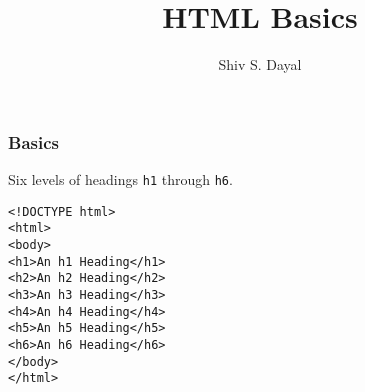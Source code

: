 \documentclass[aspectratio=1610]{beamer}
\begin{document}
\begin{frame}
\title{HTML Basics}
\author{Shiv S. Dayal}
\titlepage
\end{frame}

\begin{frame}[fragile]
\frametitle{Basics}
Six levels of headings \texttt{h1} through \texttt{h6}.
\begin{verbatim}
<!DOCTYPE html>
<html>
<body>
<h1>An h1 Heading</h1>
<h2>An h2 Heading</h2>
<h3>An h3 Heading</h3>
<h4>An h4 Heading</h4>
<h5>An h5 Heading</h5>
<h6>An h6 Heading</h6>
</body>
</html>
\end{verbatim}
\end{frame}
\end{document}
